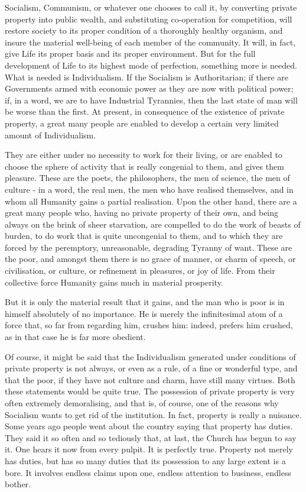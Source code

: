 Socialism, Communism, or whatever one chooses to call it, by converting private property into public wealth, and substituting co-operation for competition, will restore society to its proper condition of a thoroughly healthy organism, and insure the material well-being of each member of the community. It will, in fact, give Life its proper basis and its proper environment. But for the full development of Life to its highest mode of perfection, something more is needed. What is needed is Individualism. If the Socialism is Authoritarian; if there are Governments armed with economic power as they are now with political power; if, in a word, we are to have Industrial Tyrannies, then the last state of man will be worse than the first. At present, in consequence of the existence of private property, a great many people are enabled to develop a certain very limited amount of Individualism.\par

They are either under no necessity to work for their living, or are enabled to choose the sphere of activity that is really congenial to them, and gives them pleasure. These are the poets, the philosophers, the men of science, the men of culture - in a word, the real men, the men who have realised themselves, and in whom all Humanity gains a partial realisation. Upon the other hand, there are a great many people who, having no private property of their own, and being always on the brink of sheer starvation, are compelled to do the work of beasts of burden, to do work that is quite uncongenial to them, and to which they are forced by the peremptory, unreasonable, degrading Tyranny of want. These are the poor, and amongst them there is no grace of manner, or charm of speech, or civilisation, or culture, or refinement in pleasures, or joy of life. From their collective force Humanity gains much in material prosperity.\par

But it is only the material result that it gains, and the man who is poor is in himself absolutely of no importance. He is merely the infinitesimal atom of a force that, so far from regarding him, crushes him: indeed, prefers him crushed, as in that case he is far more obedient.\par

Of course, it might be said that the Individualism generated under conditions of private property is not always, or even as a rule, of a fine or wonderful type, and that the poor, if they have not culture and charm, have still many virtues. Both these statements would be quite true. The possession of private property is very often extremely demoralising, and that is, of course, one of the reasons why Socialism wants to get rid of the institution. In fact, property is really a nuisance. Some years ago people went about the country saying that property has duties. They said it so often and so tediously that, at last, the Church has begun to say it. One hears it now from every pulpit. It is perfectly true. Property not merely has duties, but has so many duties that its possession to any large extent is a bore. It involves endless claims upon one, endless attention to business, endless bother.\par


